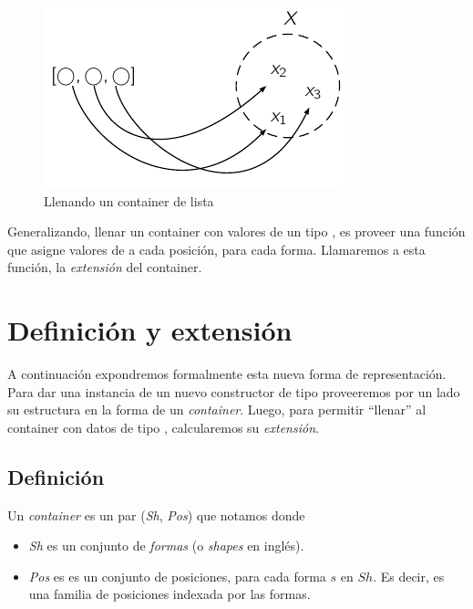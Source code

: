 \begin{figure}[H]
\begin{center}
  \includegraphics{img/container.pdf}
\end{center}
\caption{Llenando un container de lista}
\label{fig:List}
\end{figure}

Generalizando, llenar un container con valores de un tipo , es proveer una función que asigne valores de  a cada posición, para cada forma. Llamaremos a esta función, la {\it extensión} del container.
 

\section{Definición y extensión}

A continuación expondremos formalmente esta nueva forma de representación. Para dar una instancia de un nuevo constructor de tipo proveeremos por un lado su estructura en la forma de un {\it container}. Luego, para permitir ``llenar'' al container con datos de tipo , calcularemos su {\it extensión}. 


\subsection{Definición}

\begin{definition}
  Un {\it container} es un par ({\it Sh}, {\it Pos}) que notamos  donde

  \begin{itemize}
  \item {\it Sh} es un conjunto de {\it formas} (o {\it shapes} en inglés).
  \item {\it Pos} es es un conjunto de posiciones, para cada forma $s$ en $Sh$. 
      Es decir, es una familia de posiciones indexada por las formas.
  \end{itemize}
\end{definition}



